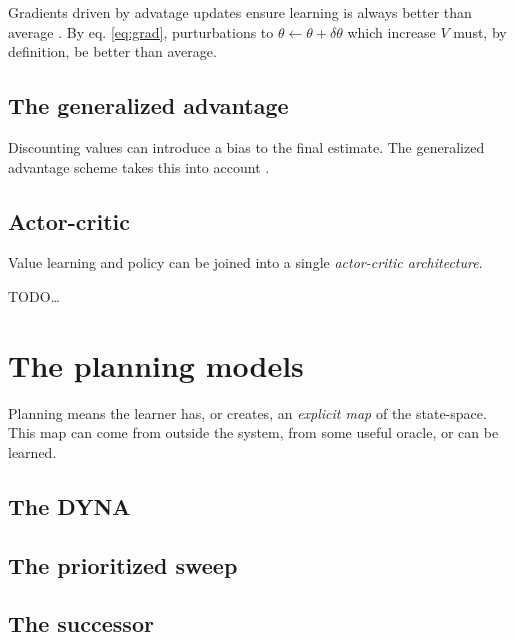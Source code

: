 \documentclass[8pt]{article}
\begin{document}
\begin{multicols}{4}
 Gradients driven by advatage updates ensure learning is always better than average \cite{Sutton}. By eq. \ref{eq:grad}, purturbations to $\theta \leftarrow \theta + \delta \theta$ which increase $V$ must, by definition, be better than average. 

\subsection*{The generalized advantage}
Discounting values can introduce a bias to the final estimate. The generalized advantage scheme takes this into account \cite{Schulman2015a}. 

\subsection*{Actor-critic}
Value learning and policy can be joined into a single \emph{actor-critic architecture}.

TODO\ldots


\vfill\null
\columnbreak
\section*{The planning models}
Planning means the learner has, or creates, an \emph{explicit map} of the state-space. This map can come from outside the system, from some useful oracle, or can be learned.

\subsection*{The DYNA}

\subsection*{The prioritized sweep}

\subsection*{The successor}

\end{multicols}

\newpage

\end{document}
